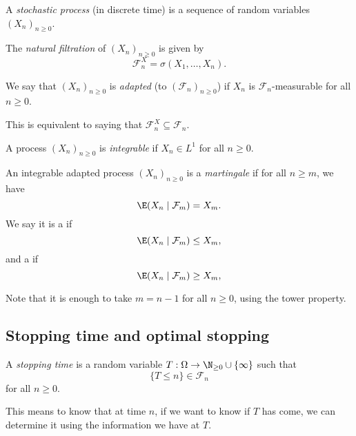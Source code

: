 \documentclass[a4paper]{article}
\begin{document}
\begin{defi}
  A \emph{stochastic process} (in discrete time) is a sequence of random variables $(X_n)_{n \geq 0}$.
\end{defi}

\begin{defi}
  The \emph{natural filtration} of $(X_n)_{n \geq 0}$ is given by
  \[
    \mathcal{F}_n^X = \sigma(X_1, \ldots, X_n).
  \]
\end{defi}

\begin{defi}
  We say that $(X_n)_{n \geq 0}$ is \emph{adapted} (to $(\mathcal{F}_n)_{n \geq 0}$) if $X_n$ is $\mathcal{F}_n$-measurable for all $n \geq 0$.

  This is equivalent to saying that $\mathcal{F}^X_n \subseteq \mathcal{F}_n$.
\end{defi}

\begin{defi}
  A process $(X_n)_{n \geq 0}$ is \emph{integrable} if $X_n \in L^1$ for all $n \geq 0$.
\end{defi}

\begin{defi}[Martingale]
  An integrable adapted process $(X_n)_{n \geq 0}$ is a \emph{martingale} if for all $n \geq m$, we have
  \[
    \E(X_n \mid \mathcal{F}_m) = X_m.
  \]
  We say it is a  if
  \[
    \E(X_n \mid \mathcal{F}_m) \leq X_m,
  \]
  and a  if
  \[
    \E(X_n \mid \mathcal{F}_m) \geq X_m,
  \]
\end{defi}

Note that it is enough to take $m = n - 1$ for all $n \geq 0$, using the tower property.

\subsection{Stopping time and optimal stopping}

\begin{defi}
  A \emph{stopping time} is a random variable $T: \Omega \to \N_{ \geq 0} \cup \{\infty\}$ such that
  \[
    \{T \leq n\} \in \mathcal{F}_n
  \]
  for all $n \geq 0$.
\end{defi}
This means to know that at time $n$, if we want to know if $T$ has come, we can determine it using the information we have at $T$.
\end{document}
